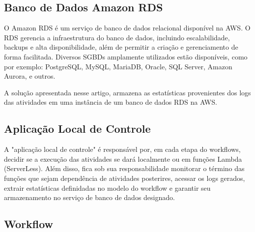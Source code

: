 \subsection{Banco de Dados Amazon RDS}
O Amazon RDS é um serviço de banco de dados relacional disponível na AWS. O RDS gerencia a infraestrutura do banco de dados, incluindo escalabilidade, backups e alta disponibilidade, além de permitir a criação e gerenciamento de forma facilitada. Diversos SGBDs amplamente utilizados estão disponíveis, como por exemplo: PostgreSQL, MySQL, MariaDB, Oracle, SQL Server, Amazon Aurora, e outros.

A solução apresentada nesse artigo, armazena as estatísticas provenientes dos logs das atividades em uma instância de um banco de dados RDS na AWS.


\subsection{Aplicação Local de Controle}
A "aplicação local de controle" é responsável por, em cada etapa do workflows, decidir se a execução das atividades se dará localmente ou em funções Lambda (ServerLess). Além disso, fica sob sua responsabilidade monitorar o término das funções que sejam dependência de atividades posterires, acessar os logs gerados, extrair estatísticas definidadas no modelo do workflow e garantir seu armazenamento no serviço de banco de dados designado.


\subsection{Workflow}








